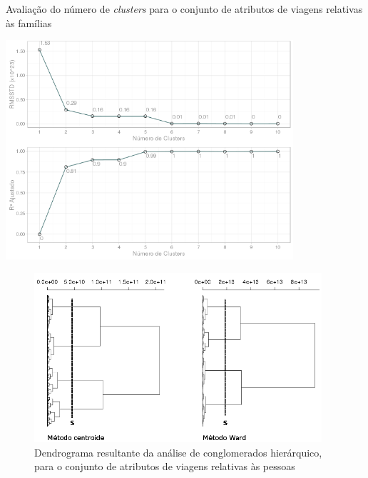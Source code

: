 \begin{grafico}[htb]%
    \caption{\label{graf:rmsstd-r2-cluster-fam-total}Avaliação do número de \textit{clusters} para o conjunto de atributos de viagens relativas às famílias}%
    \begin{center}%
        \includegraphics[width=0.8\textwidth]{./imagens/No-clusters-R2-RMSSTD-familia.png}%
    \end{center}%
\end{grafico}%


\begin{figure}[htb]%
    \caption{\label{fig:cluster-pess-total}Dendrograma resultante da análise de conglomerados hierárquico, para o conjunto de atributos de viagens relativas às pessoas}%
    \begin{center}%
        \includegraphics[width=0.95\textwidth]{./imagens/dendro-hierarq-cluster-pessoa-total-final.png}%
    \end{center}%
\end{figure}%

